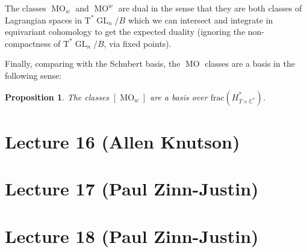 \documentclass[12pt]{amsart}
\numberwithin{equation}{section}
\newtheorem{Proposition}[equation]{Proposition}
\theoremstyle{definition}
\numberwithin{figure}{section}
\newcommand{\C}{\mathbb{C}}
\newcommand{\GL}{\operatorname{GL}}
\newcommand{\MO}{\operatorname{MO}}
\begin{document}
The classes $\MO_w$ and $\MO^w$ are dual in the sense that they are both classes of Lagrangian spaces in $\text{T}^* \GL_n/B$ which we can intersect and integrate in equivariant cohomology to get the expected duality (ignoring the non-compactness of $\text{T}^* \GL_n/B$, via fixed points).

Finally, comparing with the Schubert basis, the $\MO$ classes are a basis in the following sense:
\begin{Proposition}
	The classes $[\MO_w]$ are a basis over $\text{frac}(H^*_{T\times\C^*})$.
\end{Proposition}

\section{Lecture 16 (Allen Knutson)}

\section{Lecture 17 (Paul Zinn-Justin)}

\section{Lecture 18 (Paul Zinn-Justin)}
\end{document}
